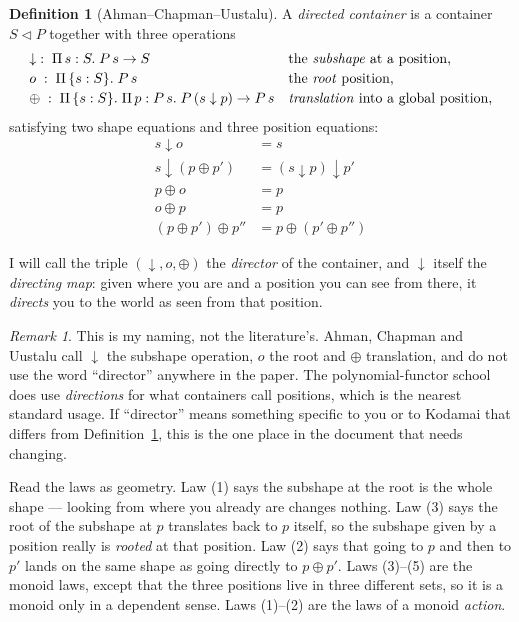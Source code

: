 \documentclass[11pt,a4paper]{article}
\theoremstyle{definition}
\newtheorem{definition}{Definition}
\theoremstyle{plain}
\theoremstyle{remark}
\newtheorem*{remark}{Remark}
\newcommand{\dc}{\ensuremath{S \triangleleft P}}
\begin{document}
\begin{definition}[Ahman--Chapman--Uustalu]\label{def:dc}
A \emph{directed container} is a container \dc{} together with three operations
\[
\begin{array}{ll}
  \downarrow \;:\; \Pi\,s : S.\; P\,s \to S
    & \text{the \emph{subshape} at a position,}\\[2pt]
  o \;:\; \Pi\,\{s : S\}.\; P\,s
    & \text{the \emph{root} position,}\\[2pt]
  \oplus \;:\; \Pi\,\{s : S\}.\;\Pi\,p : P\,s.\; P\,(s \downarrow p) \to P\,s
    & \text{\emph{translation} into a global position,}
\end{array}
\]
satisfying two shape equations and three position equations:
\begin{align}
  s \downarrow o &= s \\
  s \downarrow (p \oplus p') &= (s \downarrow p) \downarrow p' \\
  p \oplus o &= p \\
  o \oplus p &= p \\
  (p \oplus p') \oplus p'' &= p \oplus (p' \oplus p'')
\end{align}
\end{definition}

I will call the triple $(\downarrow, o, \oplus)$ the \emph{director} of the
container, and $\downarrow$ itself the \emph{directing map}: given where you are
and a position you can see from there, it \emph{directs} you to the world as
seen from that position.

\begin{remark}
This is my naming, not the literature's. Ahman, Chapman and Uustalu call
$\downarrow$ the subshape operation, $o$ the root and $\oplus$ translation, and
do not use the word ``director'' anywhere in the paper. The polynomial-functor
school does use \emph{directions} for what containers call positions, which is
the nearest standard usage. If ``director'' means something specific to you or
to Kodamai that differs from Definition~\ref{def:dc}, this is the one place in
the document that needs changing.
\end{remark}

Read the laws as geometry. Law (1) says the subshape at the root is the whole
shape --- looking from where you already are changes nothing. Law (3) says the
root of the subshape at $p$ translates back to $p$ itself, so the subshape given
by a position really is \emph{rooted} at that position. Law (2) says that going
to $p$ and then to $p'$ lands on the same shape as going directly to
$p \oplus p'$. Laws (3)--(5) are the monoid laws, except that the three
positions live in three different sets, so it is a monoid only in a dependent
sense. Laws (1)--(2) are the laws of a monoid \emph{action}.
\end{document}

